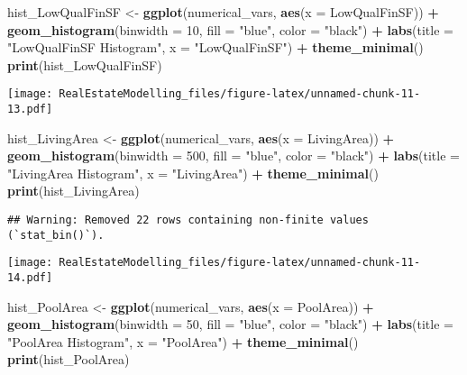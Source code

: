 \documentclass[
]{article}
\newenvironment{Shaded}{\begin{snugshade}}{\end{snugshade}}
\newcommand{\AttributeTok}[1]{\textcolor[rgb]{0.13,0.29,0.53}{#1}}
\newcommand{\DecValTok}[1]{\textcolor[rgb]{0.00,0.00,0.81}{#1}}
\newcommand{\FunctionTok}[1]{\textcolor[rgb]{0.13,0.29,0.53}{\textbf{#1}}}
\newcommand{\NormalTok}[1]{#1}
\newcommand{\OtherTok}[1]{\textcolor[rgb]{0.56,0.35,0.01}{#1}}
\newcommand{\SpecialCharTok}[1]{\textcolor[rgb]{0.81,0.36,0.00}{\textbf{#1}}}
\newcommand{\StringTok}[1]{\textcolor[rgb]{0.31,0.60,0.02}{#1}}
\begin{document}
\begin{Shaded}
\begin{Highlighting}[]
\NormalTok{hist\_LowQualFinSF }\OtherTok{\textless{}{-}} \FunctionTok{ggplot}\NormalTok{(numerical\_vars, }\FunctionTok{aes}\NormalTok{(}\AttributeTok{x =}\NormalTok{ LowQualFinSF)) }\SpecialCharTok{+}
  \FunctionTok{geom\_histogram}\NormalTok{(}\AttributeTok{binwidth =} \DecValTok{10}\NormalTok{, }\AttributeTok{fill =} \StringTok{"blue"}\NormalTok{, }\AttributeTok{color =} \StringTok{"black"}\NormalTok{) }\SpecialCharTok{+}
  \FunctionTok{labs}\NormalTok{(}\AttributeTok{title =} \StringTok{"LowQualFinSF Histogram"}\NormalTok{, }\AttributeTok{x =} \StringTok{"LowQualFinSF"}\NormalTok{) }\SpecialCharTok{+}
  \FunctionTok{theme\_minimal}\NormalTok{()}
\FunctionTok{print}\NormalTok{(hist\_LowQualFinSF)}
\end{Highlighting}
\end{Shaded}

\texttt{[image: RealEstateModelling\_files/figure-latex/unnamed-chunk-11-13.pdf]}

\begin{Shaded}
\begin{Highlighting}[]
\NormalTok{hist\_LivingArea }\OtherTok{\textless{}{-}} \FunctionTok{ggplot}\NormalTok{(numerical\_vars, }\FunctionTok{aes}\NormalTok{(}\AttributeTok{x =}\NormalTok{ LivingArea)) }\SpecialCharTok{+}
  \FunctionTok{geom\_histogram}\NormalTok{(}\AttributeTok{binwidth =} \DecValTok{500}\NormalTok{, }\AttributeTok{fill =} \StringTok{"blue"}\NormalTok{, }\AttributeTok{color =} \StringTok{"black"}\NormalTok{) }\SpecialCharTok{+}
  \FunctionTok{labs}\NormalTok{(}\AttributeTok{title =} \StringTok{"LivingArea Histogram"}\NormalTok{, }\AttributeTok{x =} \StringTok{"LivingArea"}\NormalTok{) }\SpecialCharTok{+}
  \FunctionTok{theme\_minimal}\NormalTok{()}
\FunctionTok{print}\NormalTok{(hist\_LivingArea)}
\end{Highlighting}
\end{Shaded}

\begin{verbatim}
## Warning: Removed 22 rows containing non-finite values (`stat_bin()`).
\end{verbatim}

\texttt{[image: RealEstateModelling\_files/figure-latex/unnamed-chunk-11-14.pdf]}

\begin{Shaded}
\begin{Highlighting}[]
\NormalTok{hist\_PoolArea }\OtherTok{\textless{}{-}} \FunctionTok{ggplot}\NormalTok{(numerical\_vars, }\FunctionTok{aes}\NormalTok{(}\AttributeTok{x =}\NormalTok{ PoolArea)) }\SpecialCharTok{+}
  \FunctionTok{geom\_histogram}\NormalTok{(}\AttributeTok{binwidth =} \DecValTok{50}\NormalTok{, }\AttributeTok{fill =} \StringTok{"blue"}\NormalTok{, }\AttributeTok{color =} \StringTok{"black"}\NormalTok{) }\SpecialCharTok{+}
  \FunctionTok{labs}\NormalTok{(}\AttributeTok{title =} \StringTok{"PoolArea Histogram"}\NormalTok{, }\AttributeTok{x =} \StringTok{"PoolArea"}\NormalTok{) }\SpecialCharTok{+}
  \FunctionTok{theme\_minimal}\NormalTok{()}
\FunctionTok{print}\NormalTok{(hist\_PoolArea)}
\end{Highlighting}
\end{Shaded}
\end{document}
